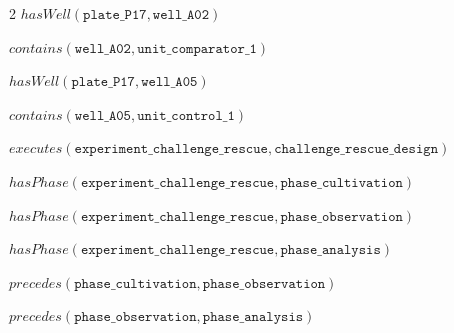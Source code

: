 \documentclass[10pt,a4paper]{article}
\begin{document}
{\begin{multicols}{2}
$\mathit{hasWell}(\mathtt{plate\_\allowbreak{}P17}, \mathtt{well\_\allowbreak{}A02})$\par
$\mathit{contains}(\mathtt{well\_\allowbreak{}A02}, \mathtt{unit\_\allowbreak{}comparator\_\allowbreak{}1})$\par
$\mathit{hasWell}(\mathtt{plate\_\allowbreak{}P17}, \mathtt{well\_\allowbreak{}A05})$\par
$\mathit{contains}(\mathtt{well\_\allowbreak{}A05}, \mathtt{unit\_\allowbreak{}control\_\allowbreak{}1})$\par
$\mathit{executes}(\mathtt{experiment\_\allowbreak{}challenge\_\allowbreak{}rescue}, \mathtt{challenge\_\allowbreak{}rescue\_\allowbreak{}design})$\par
$\mathit{hasPhase}(\mathtt{experiment\_\allowbreak{}challenge\_\allowbreak{}rescue}, \mathtt{phase\_\allowbreak{}cultivation})$\par
$\mathit{hasPhase}(\mathtt{experiment\_\allowbreak{}challenge\_\allowbreak{}rescue}, \mathtt{phase\_\allowbreak{}observation})$\par
$\mathit{hasPhase}(\mathtt{experiment\_\allowbreak{}challenge\_\allowbreak{}rescue}, \mathtt{phase\_\allowbreak{}analysis})$\par
$\mathit{precedes}(\mathtt{phase\_\allowbreak{}cultivation}, \mathtt{phase\_\allowbreak{}observation})$\par
$\mathit{precedes}(\mathtt{phase\_\allowbreak{}observation}, \mathtt{phase\_\allowbreak{}analysis})$\par
\end{multicols}}
\end{document}
